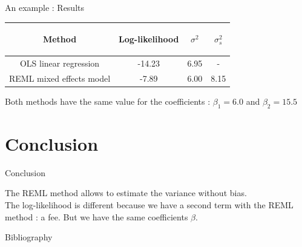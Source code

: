 \documentclass[unknownkeysallowed]{beamer}
\begin{document}
\begin{frame}{An example : Results}

\begin{table}[h!]
    \centering
    \begin{tabular}{| c | c | c|c|}
        \hline
        \begin{bf} Method \end{bf} &
        \begin{bf} Log-likelihood \end{bf} &
        \begin{bf} $\sigma^2$ \end{bf} &
        \begin{bf} $\sigma_s^2$ \end{bf} \\
        \hline
        OLS linear regression &  -14.23 & 6.95 & -\\
        REML mixed effects model  & -7.89 & 6.00 & 8.15 \\
        \hline
    \end{tabular}
\end{table}
\vspace{1cm}
Both methods have the same value for the coefficients : $\beta_1=6.0$ and $\beta_2=15.5$
\end{frame}


\section{Conclusion}
\label{sec:conclusion}


\begin{frame}{Conclusion}

The REML method allows to estimate the variance without bias.\\
\vspace{0.5cm}
The log-likelihood is different because we have a second term with the REML method : a fee. But we have the same coefficients $\beta$.
\end{frame}

\begin{frame}{Bibliography}
\nocite{*}
\printbibliography
\end{frame}
\end{document}
